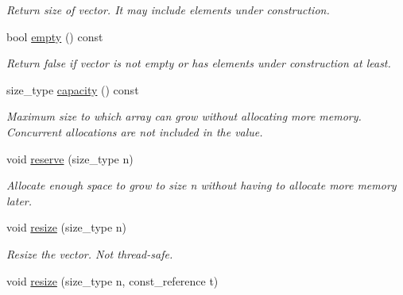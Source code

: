 \begin{DoxyCompactItemize}
\begin{DoxyCompactList}\small\item\em Return size of vector. It may include elements under construction. \end{DoxyCompactList}\item 
\hypertarget{classtbb_1_1concurrent__vector_a3747f2cbd9fc6033f34a6fc8ef6b932b}{}bool \hyperlink{classtbb_1_1concurrent__vector_a3747f2cbd9fc6033f34a6fc8ef6b932b}{empty} () const \label{classtbb_1_1concurrent__vector_a3747f2cbd9fc6033f34a6fc8ef6b932b}

\begin{DoxyCompactList}\small\item\em Return false if vector is not empty or has elements under construction at least. \end{DoxyCompactList}\item 
\hypertarget{classtbb_1_1concurrent__vector_ac0d13882cdbc4d838b383979749cd2f6}{}size\+\_\+type \hyperlink{classtbb_1_1concurrent__vector_ac0d13882cdbc4d838b383979749cd2f6}{capacity} () const \label{classtbb_1_1concurrent__vector_ac0d13882cdbc4d838b383979749cd2f6}

\begin{DoxyCompactList}\small\item\em Maximum size to which array can grow without allocating more memory. Concurrent allocations are not included in the value. \end{DoxyCompactList}\item 
void \hyperlink{classtbb_1_1concurrent__vector_a24af110c649d48c1edaa3a55b2063bbd}{reserve} (size\+\_\+type n)
\begin{DoxyCompactList}\small\item\em Allocate enough space to grow to size n without having to allocate more memory later. \end{DoxyCompactList}\item 
\hypertarget{classtbb_1_1concurrent__vector_a5dcd05ac1bb8e7e1caea51fd45fa9f92}{}void \hyperlink{classtbb_1_1concurrent__vector_a5dcd05ac1bb8e7e1caea51fd45fa9f92}{resize} (size\+\_\+type n)\label{classtbb_1_1concurrent__vector_a5dcd05ac1bb8e7e1caea51fd45fa9f92}

\begin{DoxyCompactList}\small\item\em Resize the vector. Not thread-\/safe. \end{DoxyCompactList}\item 
\hypertarget{classtbb_1_1concurrent__vector_a75df26643ed706f5b1e509d6673dfcd7}{}void \hyperlink{classtbb_1_1concurrent__vector_a75df26643ed706f5b1e509d6673dfcd7}{resize} (size\+\_\+type n, const\+\_\+reference t)\label{classtbb_1_1concurrent__vector_a75df26643ed706f5b1e509d6673dfcd7}


\end{DoxyCompactItemize}
